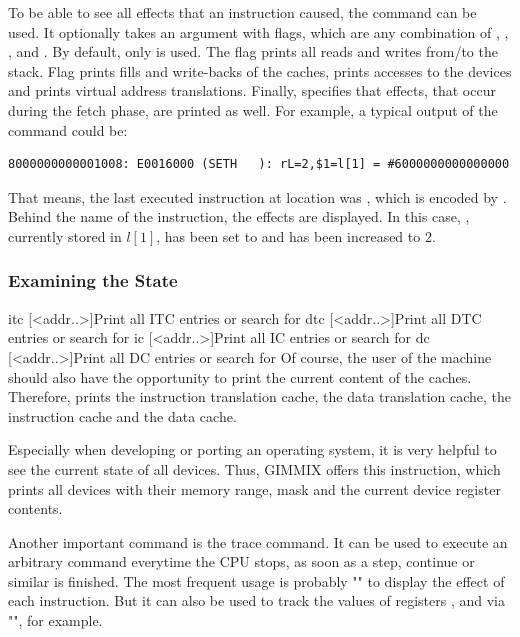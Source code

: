 \noindent To be able to see all effects that an instruction caused, the command  can be used. It optionally takes an argument with flags, which are any combination of , , ,  and . By default, only  is used. The flag  prints all reads and writes from/to the stack. Flag  prints fills and write-backs of the caches,  prints accesses to the devices and  prints virtual address translations. Finally,  specifies that effects, that occur during the fetch phase, are printed as well. For example, a typical output of the command could be:
\begin{verbatim}
8000000000001008: E0016000 (SETH   ): rL=2,$1=l[1] = #6000000000000000
\end{verbatim}
That means, the last executed instruction at location  was , which is encoded by . Behind the name of the instruction, the effects are displayed. In this case, , currently stored in $l[1]$, has been set to  and  has been increased to 2.

\subsubsection{Examining the State}

\gcmdtblfour
	{itc [<addr..>]}{Print all ITC entries or search for }
	{dtc [<addr..>]}{Print all DTC entries or search for }
	{ic [<addr..>]}{Print all IC entries or search for }
	{dc [<addr..>]}{Print all DC entries or search for }
\noindent Of course, the user of the machine should also have the opportunity to print the current content of the caches. Therefore,  prints the instruction translation cache,  the data translation cache,  the instruction cache and  the data cache.

\noindent Especially when developing or porting an operating system, it is very helpful to see the current state of all devices. Thus, GIMMIX offers this instruction, which prints all devices with their memory range,  mask and the current device register contents.

\noindent Another important command is the trace command. It can be used to execute an arbitrary command everytime the CPU stops, \ie as soon as a step, continue or similar is finished. The most frequent usage is probably "" to display the effect of each instruction. But it can also be used to track the values of registers ,  and  via "", for example.

